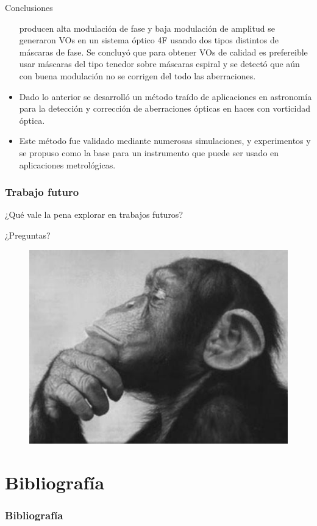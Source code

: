 \documentclass[xcolor=table,serif]{beamer}
\begin{document}
\begin{frame}{Conclusiones}
\begin{itemize}
   producen alta modulación de fase y baja modulación de amplitud se
   generaron VOs en un sistema óptico 4F usando dos tipos distintos de
   máscaras de fase. Se concluyó que para obtener VOs de calidad es
   prefereible usar máscaras del tipo tenedor sobre máscaras espiral y
   se detectó que aún con buena modulación no se corrigen del todo las aberraciones. 
\item Dado lo anterior se desarrolló un método traído de aplicaciones
  en astronomía para la detección y corrección de aberraciones ópticas en haces con vorticidad óptica.
\item Este método fue validado mediante numerosas simulaciones, y
  experimentos y se propuso como la base para un instrumento que puede
  ser usado en aplicaciones metrológicas. 
\end{itemize}
\end{frame}

\begin{frame}
  \frametitle{Trabajo futuro}
    ¿Qué vale la pena explorar en trabajos futuros?	
\end{frame}
\begin{frame}{¿Preguntas?}
  \begin{figure}
    \centering
    \includegraphics[scale=0.5]{Figures/presentation/thinker.jpeg}	
  \end{figure}
\end{frame}

\section{Bibliograf\'ia}
  \begin{frame}[allowframebreaks]
  \frametitle{Bibliograf\'ia}
  
  
  \end{frame}
\end{document}
